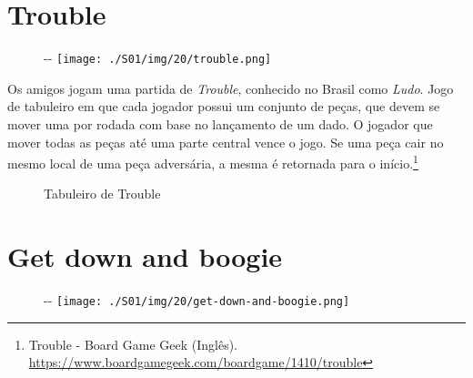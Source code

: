 \hypertarget{trouble}{%
\section{Trouble}\label{trouble}}

\begin{figure}[!ht]
  \begin{adjustwidth}{-\oddsidemargin-1in}{-\rightmargin}
    \centering
    \texttt{[image: ./S01/img/20/trouble.png]}
  \end{adjustwidth}
\end{figure}

Os amigos jogam uma partida de \emph{Trouble}, conhecido no Brasil como
\emph{Ludo}. Jogo de tabuleiro em que cada jogador possui um conjunto de
peças, que devem se mover uma por rodada com base no lançamento de um
dado. O jogador que mover todas as peças até uma parte central vence o
jogo. Se uma peça cair no mesmo local de uma peça adversária, a mesma é
retornada para o início.\footnote{\sloppy Trouble - Board Game Geek (Inglês). \url{https://www.boardgamegeek.com/boardgame/1410/trouble}}

\begin{figure}
  \centering
    \caption{Tabuleiro de Trouble\label{fig:tabuleiro-de-trouble}}
\end{figure}

\hypertarget{get-down-and-boogie}{%
\section{Get down and boogie}\label{get-down-and-boogie}}

\begin{figure}[!ht]
  \begin{adjustwidth}{-\oddsidemargin-1in}{-\rightmargin}
    \centering
    \texttt{[image: ./S01/img/20/get-down-and-boogie.png]}
  \end{adjustwidth}
\end{figure}

